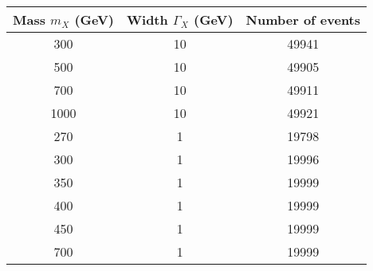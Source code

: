 \begin{tabular}{|c|c|c|}
\hline
Mass $m_X$ (GeV) & Width $\Gamma_X$ (GeV) & Number of events \\ \hline
300 & 10 & 49941 \\
500 & 10 & 49905 \\
700 & 10 & 49911 \\
1000& 10 & 49921 \\\hline
270 &  1 & 19798 \\
300 &  1 & 19996 \\
350 &  1 & 19999 \\
400 &  1 & 19999 \\
450 &  1 & 19999 \\
700 &  1 & 19999 \\
\hline
\end{tabular}
